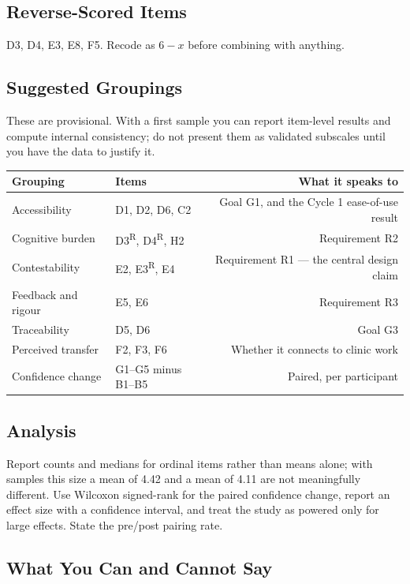 \documentclass[11pt,letterpaper]{article}
\newcommand{\R}{\textsuperscript{R}}
\begin{document}
\subsection{Reverse-Scored Items}

D3, D4, E3, E8, F5. Recode as $6 - x$ before combining with anything.

\subsection{Suggested Groupings}

These are provisional. With a first sample you can report item-level results and
compute internal consistency; do not present them as validated subscales until
you have the data to justify it.

\begin{center}
\small
\begin{tabularx}{\textwidth}{@{}l l R@{}}
\toprule
\textbf{Grouping} & \textbf{Items} & \textbf{What it speaks to} \\
\midrule
Accessibility & D1, D2, D6, C2 & Goal G1, and the Cycle 1 ease-of-use result \\
Cognitive burden & D3\R, D4\R, H2 & Requirement R2 \\
Contestability & E2, E3\R, E4 & Requirement R1 --- the central design claim \\
Feedback and rigour & E5, E6 & Requirement R3 \\
Traceability & D5, D6 & Goal G3 \\
Perceived transfer & F2, F3, F6 & Whether it connects to clinic work \\
Confidence change & G1--G5 minus B1--B5 & Paired, per participant \\
\bottomrule
\end{tabularx}
\end{center}

\subsection{Analysis}

Report counts and medians for ordinal items rather than means alone; with samples
this size a mean of 4.42 and a mean of 4.11 are not meaningfully different.
Use Wilcoxon signed-rank for the paired confidence change, report an effect size
with a confidence interval, and treat the study as powered only for large
effects. State the pre/post pairing rate.

\subsection{What You Can and Cannot Say}
\end{document}
